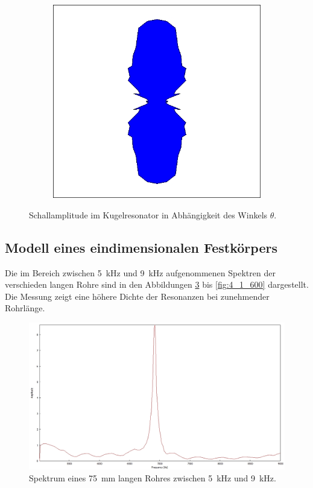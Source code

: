 \begin{figure}
\begin{subfigure}{0.4\textwidth}
\includegraphics[width=\textwidth]{content/messungen/Chapter2new/2_3_5.jpg}
\label{fig:2_3_5}
\end{subfigure}
\caption{Schallamplitude im Kugelresonator in Abhängigkeit des Winkels $\theta$.}
\label{fig:kugelflaechenfunktionen}
\end{figure}
\FloatBarrier
\subsection{Modell eines eindimensionalen Festkörpers}
\label{subsec:Modell eines eindimensionalen Festkörpers}
Die im Bereich zwischen 5~kHz und 9~kHz aufgenommenen Spektren der verschieden langen Rohre sind in den Abbildungen \ref{fig:4_1_75} bis \ref{fig:4_1_600} dargestellt.
Die Messung zeigt eine höhere Dichte der Resonanzen bei zunehmender Rohrlänge.
\begin{figure}
\centering
\includegraphics[width=1\textwidth]{content/messungen/Chapter4/4_1_75mm.jpg}
\caption{Spektrum eines 75~mm langen Rohres zwischen 5~kHz und 9~kHz.}
\label{fig:4_1_75}
\end{figure}


